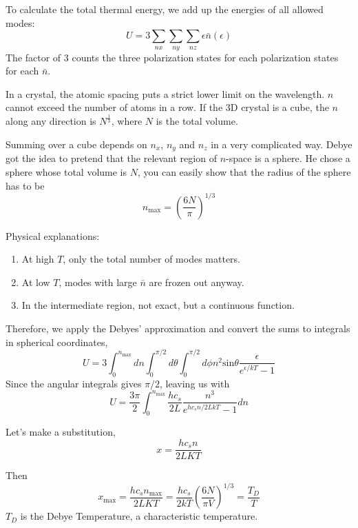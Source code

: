 To calculate the total thermal energy, we add up the energies of all allowed modes:
\begin{equation}
U = 3\sum_{nx}\sum_{ny}\sum_{nz} \epsilon \bar{n}(\epsilon)
\end{equation}
The factor of 3 counts the three polarization states for each polarization states for each $\bar{n}$.

In a crystal, the atomic spacing puts a strict lower limit on the wavelength. $n$ cannot exceed the number of atoms in a row. If the 3D crystal 
is a cube, the $n$ along any direction is $N^{\frac{1}{3}}$, where $N$ is the total volume.

Summing over a cube depends on $n_x$, $n_y$ and $n_z$ in a very complicated way. Debye got the idea to pretend that the relevant region of $n$-space is 
a sphere. He chose a sphere whose total volume is $N$, you can easily show that the radius of the sphere has to be
\begin{equation}
n_\textrm{max} = (\frac{6N}{\pi})^{1/3}
\end{equation}

Physical explanations:
\begin{enumerate}
\item At high $T$, only the total number of modes matters.
\item At low $T$, modes with large $\bar{n}$ are frozen out anyway.
\item In the intermediate region, not exact, but a continuous function.
\end{enumerate}

Therefore, we apply the Debyes' approximation and convert the sums to integrals in spherical coordinates,
\begin{equation}
U = 3 \int_0^{n_\textrm{max}} dn \int_0^{\pi/2} d\theta \int_0^{\pi/2} d\phi n^2\textrm{sin}\theta \frac{\epsilon}{e^{\epsilon/kT}-1}
\end{equation}
Since the angular integrals gives $\pi/2$, leaving us with
\begin{equation}
U = \frac{3\pi}{2} \int_0 ^{n_\textrm{max}} \frac{hc_s}{2L} \frac{n^3}{e^{hc_sn/2LkT}-1} dn
\end{equation}

Let's make a substitution,
\begin{equation}
x = \frac{hc_sn}{2LKT}
\end{equation}

Then 
\begin{equation}
x_\textrm{max} = \frac{hc_s n_{\textrm{max}}}{2LKT} = \frac{hc_s}{2kT} (\frac{6N}{\pi V})^{1/3} = \frac{T_D}{T}
\end{equation}
$T_D$ is the Debye Temperature, a characteristic temperature. 

